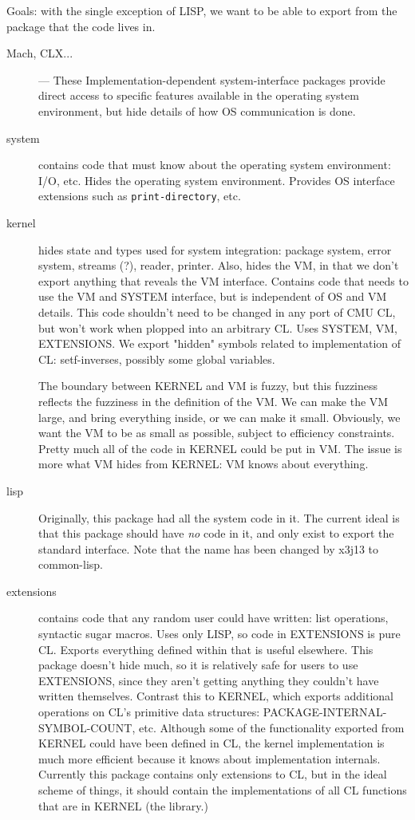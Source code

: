 Goals: with the single exception of LISP, we want to be able to export from the
package that the code lives in.

\begin{description}
\item[Mach, CLX...] --- These Implementation-dependent system-interface
packages provide direct access to specific features available in the operating
system environment, but hide details of how OS communication is done.

\item[system] contains code that must know about the operating system
environment: I/O, etc.  Hides the operating system environment.  Provides OS
interface extensions such as {\tt print-directory}, etc.

\item[kernel] hides state and types used for system integration: package
system, error system, streams (?), reader, printer.  Also, hides the VM, in
that we don't export anything that reveals the VM interface.  Contains code
that needs to use the VM and SYSTEM interface, but is independent of OS and VM
details.  This code shouldn't need to be changed in any port of CMU CL, but
won't work when plopped into an arbitrary CL.  Uses SYSTEM, VM, EXTENSIONS.  We
export "hidden" symbols related to implementation of CL: setf-inverses,
possibly some global variables.

The boundary between KERNEL and VM is fuzzy, but this fuzziness reflects the
fuzziness in the definition of the VM.  We can make the VM large, and bring
everything inside, or we can make it small.  Obviously, we want the VM to be
as small as possible, subject to efficiency constraints.  Pretty much all of
the code in KERNEL could be put in VM.  The issue is more what VM hides from
KERNEL: VM knows about everything.

\item[lisp]  Originally, this package had all the system code in it.  The
current ideal is that this package should have {\it no} code in it, and only
exist to export the standard interface.  Note that the name has been changed by
x3j13 to common-lisp.

\item[extensions] contains code that any random user could have written: list
operations, syntactic sugar macros.  Uses only LISP, so code in EXTENSIONS is
pure CL.  Exports everything defined within that is useful elsewhere.  This
package doesn't hide much, so it is relatively safe for users to use
EXTENSIONS, since they aren't getting anything they couldn't have written
themselves.  Contrast this to KERNEL, which exports additional operations on
CL's primitive data structures: PACKAGE-INTERNAL-SYMBOL-COUNT, etc.  Although
some of the functionality exported from KERNEL could have been defined in CL,
the kernel implementation is much more efficient because it knows about
implementation internals.  Currently this package contains only extensions to
CL, but in the ideal scheme of things, it should contain the implementations of
all CL functions that are in KERNEL (the library.)


\end{description}
